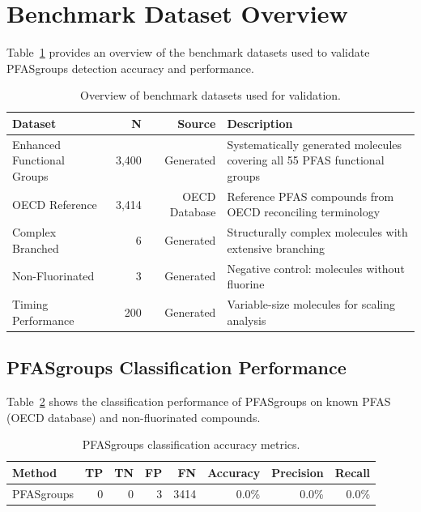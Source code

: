 
\section*{Benchmark Dataset Overview}

Table~\ref{tab:datasets} provides an overview of the benchmark datasets used to validate PFASgroups detection accuracy and performance.

\begin{table}[htbp]
\centering
\caption{Overview of benchmark datasets used for validation.}
\label{tab:datasets}
\begin{tabular}{lrrp{6cm}}
\toprule
\textbf{Dataset} & \textbf{N} & \textbf{Source} & \textbf{Description} \\
\midrule
Enhanced Functional Groups & 3,400 & Generated & Systematically generated molecules covering all 55 PFAS functional groups \\
OECD Reference & 3,414 & OECD Database & Reference PFAS compounds from OECD reconciling terminology \\
Complex Branched & 6 & Generated & Structurally complex molecules with extensive branching \\
Non-Fluorinated & 3 & Generated & Negative control: molecules without fluorine \\
Timing Performance & 200 & Generated & Variable-size molecules for scaling analysis \\
\bottomrule
\end{tabular}
\end{table}

\subsection*{PFASgroups Classification Performance}

Table~\ref{tab:pfasgroups_accuracy} shows the classification performance of PFASgroups on known PFAS (OECD database) and non-fluorinated compounds.

\begin{table}[htbp]
\centering
\caption{PFASgroups classification accuracy metrics.}
\label{tab:pfasgroups_accuracy}
\begin{tabular}{lrrrrrrr}
\toprule
\textbf{Method} & \textbf{TP} & \textbf{TN} & \textbf{FP} & \textbf{FN} & \textbf{Accuracy} & \textbf{Precision} & \textbf{Recall} \\
\midrule
PFASgroups & 0 & 0 & 3 & 3414 & 0.0\% & 0.0\% & 0.0\% \\
\bottomrule
\end{tabular}
\end{table}

